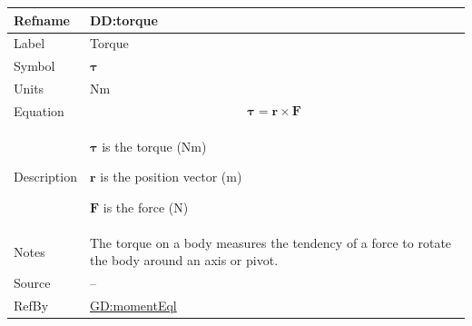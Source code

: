 \documentclass[12pt]{article}
\begin{document}
\medskip
\noindent
\begin{minipage}{\textwidth}
\begin{tabular}{>{\raggedright}p{}>{\raggedright\arraybackslash}p{}}
\toprule \textbf{Refname} & \textbf{DD:torque}
\label{DD:torque}
\\ \midrule
Label & Torque
        
\\ \midrule
Symbol & $\symbf{τ}$
         
\\ \midrule
Units & $\text{N}\text{m}$
        
\\ \midrule
Equation & \begin{displaymath}
           \symbf{τ}=\symbf{r}\times\symbf{F}
           \end{displaymath}
\\ \midrule
Description & \begin{symbDescription}
              \item{$\symbf{τ}$ is the torque ($\text{N}\text{m}$)}
              \item{$\symbf{r}$ is the position vector (${\text{m}}$)}
              \item{$\symbf{F}$ is the force (${\text{N}}$)}
              \end{symbDescription}
\\ \midrule
Notes & The torque on a body measures the tendency of a force to rotate the body around an axis or pivot.
        
\\ \midrule
Source & --
         
\\ \midrule
RefBy & \hyperref[GD:momentEql]{GD:momentEql}
        
\\ \bottomrule
\end{tabular}
\end{minipage}
\end{document}
